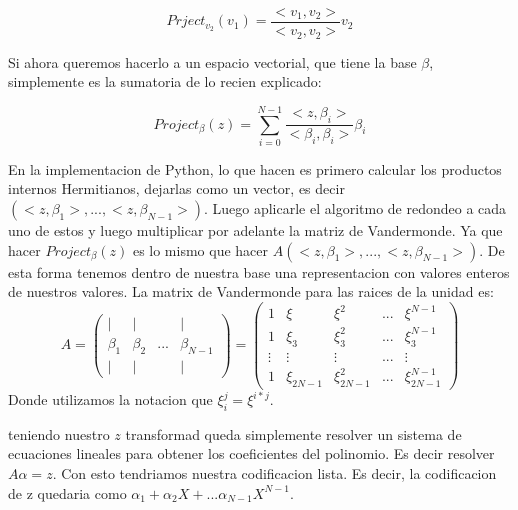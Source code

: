 \documentclass[12pt, oneside]{article}
\begin{document}
\begin{equation*}
    Prject_{v_2}(v_1) = \frac{<v_1,v_2>}{<v_2,v_2>}v_2
    \label{eq:project}
\end{equation*}

Si ahora queremos hacerlo a un espacio vectorial, que tiene la base $\beta$, simplemente
es la sumatoria de lo recien explicado:

\begin{equation*}
    Project_{\beta}(z) = \sum_{i=0}^{N-1}\frac{<z,\beta_i>}{<\beta_i,\beta_i>}\beta_i
    \label{eq:project}
\end{equation*}

En la implementacion de Python, lo que hacen es primero calcular los productos internos
Hermitianos, dejarlas como un vector, es decir $(<z,\beta_1>,...,<z,\beta_{N-1}>)$.
Luego aplicarle el algoritmo de redondeo a cada uno de estos y luego multiplicar por adelante la matriz
de Vandermonde.
Ya que hacer $ Project_{\beta}(z) $ es lo mismo que hacer $A(<z,\beta_1>,...,<z,\beta_{N-1}>)$.
De esta forma tenemos dentro de nuestra base una representacion con valores enteros de nuestros
valores.
La matrix de Vandermonde para las raices de la unidad es:
\begin{equation*}
    A=    \begin{pmatrix}
        | & | &    & | \\
        \beta_1 & \beta_2 & ... & \beta_{N-1}\\
        | & | &    & |
    \end{pmatrix}
    =
    \begin{pmatrix}
        1 & \xi &  \xi^2 & ... & \xi^{N-1} \\
        1 & \xi_3 & \xi_3^2 & ... & \xi_3^{N-1}\\
        \vdots & \vdots & \vdots & ... & \vdots\\
        1 & \xi_{2N-1} & \xi_{2N-1}^2 & ... & \xi_{2N-1}^{N-1}
    \end{pmatrix}
    \label{eq:vandermonde}
\end{equation*}
Donde utilizamos la notacion que $\xi_i^j=\xi^{i*j}$.

teniendo nuestro $z$ transformad queda simplemente resolver un sistema de ecuaciones lineales para
obtener los coeficientes del polinomio.
Es decir resolver $A\alpha=z$.
Con esto tendriamos nuestra codificacion lista.
Es decir, la codificacion de z quedaria como $\alpha_1 + \alpha_2 X + ... \alpha_{N-1}X^{N-1}$.
\end{document}
